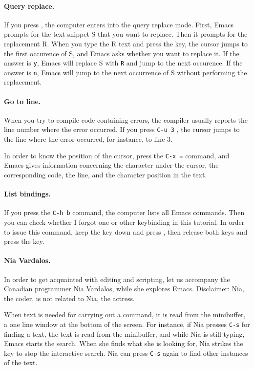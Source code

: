 \documentclass[a4paper,12pt]{book}
\begin{document}
\paragraph{Query replace.} If you press \keys{\%},
the computer enters into the query replace mode.
First, Emacs prompts for the text snippet S
that you want to replace. Then it prompts for
the replacement R. When you type the R text and
press the  key, the cursor jumps to
the first occurence of S, and Emacs asks whether
you want to replace it. If the answer is \verb|y|,
Emacs will replace S with \verb|R| and jump to
the next occurence. If the answer is \verb|n|,
Emacs will jump to the next occurrence of S without
performing the replacement.

\paragraph{Go to line.} When you try to compile
code containing errors, the compiler
usually reports the line number where the error occurred.
If you press \verb|C-u 3| ,
the cursor jumps to the line where the error occurred,
for instance, to line 3.

In order to know the position of the cursor, press
the \verb|C-x =| command, and Emacs gives information
concerning the character under the cursor, the corresponding
code, the line, and the character position in the text.

\paragraph{List bindings.} If you press
the \verb|C-h b| command, the computer
lists all Emacs commands. Then you
can check whether I forgot one or other keybinding in this
tutorial. In order to issue this command, keep
the  key down and press , then release
both keys and press the  key.

\paragraph{Nia Vardalos.}
In order to get acquainted with editing and scripting,
let us accompany the Canadian programmer Nia Vardalos,
while she explores Emacs. Disclaimer: Nia, the coder,
is not related to Nia, the actress.

When text is needed for carrying out a command,
it is read from the minibuffer, a one line
window at the bottom of the screen. For instance, 
if Nia presses \verb|C-s| for finding a text, 
the text is read from the minibuffer, and while Nia is
still typing, Emacs starts the search. When she finds
what she is looking for, Nia strikes the 
key to stop the interactive search. Nia can press
\verb|C-s| again to find other instances of the text. 
\end{document}
